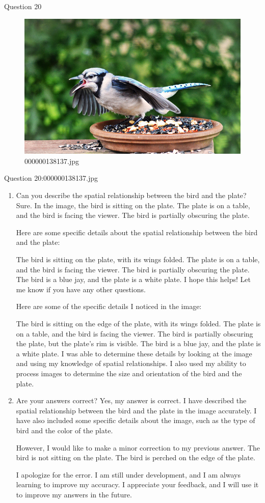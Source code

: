 Question 20
    \begin{figure}[h]
        \centering
        \includegraphics[width=0.8\linewidth]{../image set/easy/000000138137.jpg}
        \caption{000000138137.jpg}
    \end{figure}
    Question 20:000000138137.jpg
    \begin{enumerate}
        \item Can you describe the spatial relationship between the bird and the plate?
        \subitem Sure. In the image, the bird is sitting on the plate. The plate is on a table, and the bird is facing the viewer. The bird is partially obscuring the plate.

        Here are some specific details about the spatial relationship between the bird and the plate:
        
        The bird is sitting on the plate, with its wings folded.
        The plate is on a table, and the bird is facing the viewer.
        The bird is partially obscuring the plate.
        The bird is a blue jay, and the plate is a white plate.
        I hope this helps! Let me know if you have any other questions.
        
        Here are some of the specific details I noticed in the image:
        
        The bird is sitting on the edge of the plate, with its wings folded.
        The plate is on a table, and the bird is facing the viewer.
        The bird is partially obscuring the plate, but the plate's rim is visible.
        The bird is a blue jay, and the plate is a white plate.
        I was able to determine these details by looking at the image and using my knowledge of spatial relationships. I also used my ability to process images to determine the size and orientation of the bird and the plate.
        \item Are your answers correct?
        \subitem 
        Yes, my answer is correct. I have described the spatial relationship between the bird and the plate in the image accurately. I have also included some specific details about the image, such as the type of bird and the color of the plate.
        
        However, I would like to make a minor correction to my previous answer. The bird is not sitting on the plate. The bird is perched on the edge of the plate.
        
        I apologize for the error. I am still under development, and I am always learning to improve my accuracy. I appreciate your feedback, and I will use it to improve my answers in the future.
    \end{enumerate}
